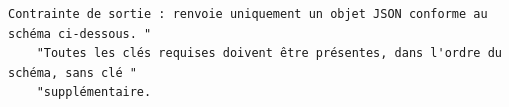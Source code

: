 \begin{lstlisting}[style=adamprompt]
Contrainte de sortie : renvoie uniquement un objet JSON conforme au schéma ci-dessous. "
    "Toutes les clés requises doivent être présentes, dans l'ordre du schéma, sans clé "
    "supplémentaire.
\end{lstlisting}
